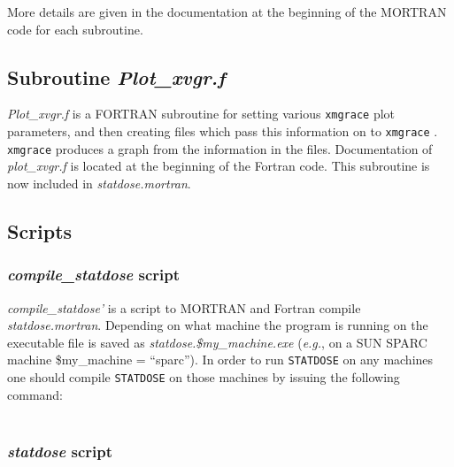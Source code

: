 \documentclass[12pt,twoside]{article}
\newcommand{\eg}{{\em e.g.}}
\begin{document}
More details are given in the documentation at the beginning of the MORTRAN code for each subroutine.

\subsection{Subroutine {\em Plot\_xvgr.f} }

{\em Plot\_xvgr.f} is a FORTRAN subroutine for setting various {\tt xmgrace}
plot parameters, and then creating files which pass this
information on to {\tt xmgrace} . {\tt xmgrace} produces a graph from
the information in the files. Documentation of {\em plot\_xvgr.f} is
located at the beginning of the Fortran code.  This subroutine is now
included in {\em statdose.mortran}.

\subsection{Scripts}

\subsubsection{{\em compile\_statdose} script}

{\em compile\_statdose'} is a script to MORTRAN and Fortran compile {\em
statdose.mortran}. Depending on what machine the program is running on the
executable file is saved as {\em statdose.\$my\_machine.exe} (\eg, on a
SUN SPARC machine \$my\_machine = ``sparc''). In order to run
\verb+STATDOSE+ on any machines one should compile \verb+STATDOSE+ on
those machines by issuing the following command:  \newline\\
\ 

\subsubsection{{\em statdose} script}
\end{document}
